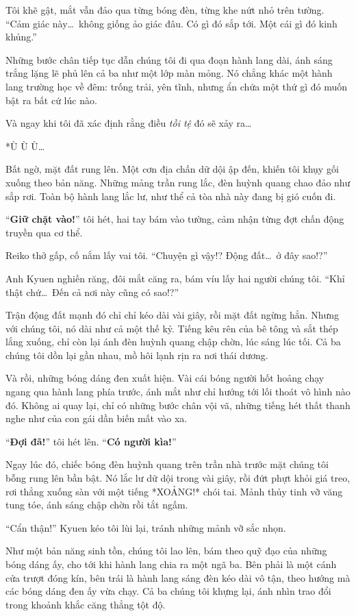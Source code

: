 \documentclass[../main.tex]{subfiles}
\begin{document}
Tôi khẽ gật, mắt vẫn đảo qua từng bóng đèn, từng khe nứt nhỏ trên tường. ``Cảm giác này\dots\ không giống ảo giác đâu. Có gì đó sắp tới. Một cái gì đó kinh khủng.''

Những bước chân tiếp tục dẫn chúng tôi đi qua đoạn hành lang dài, ánh sáng trắng lặng lẽ phủ lên cả ba như một lớp màn mỏng. Nó chẳng khác một hành lang trường học về đêm: trống trải, yên tĩnh, nhưng ẩn chứa một thứ gì đó muốn bật ra bất cứ lúc nào.

Và ngay khi tôi đã xác định rằng điều \emph{tồi tệ} đó sẽ xảy ra\dots

*Ù Ù Ù\dots*

Bất ngờ, mặt đất rung lên. Một cơn địa chấn dữ dội ập đến, khiến tôi khụy gối xuống theo bản năng. Những mảng trần rung lắc, đèn huỳnh quang chao đảo như sắp rơi. Toàn bộ hành lang lắc lư, như thể cả tòa nhà này đang bị gió cuốn đi.

``\textbf{Giữ chặt vào!}'' tôi hét, hai tay bám vào tường, cảm nhận từng đợt chấn động truyền qua cơ thể.

Reiko thở gấp, cố nắm lấy vai tôi. ``Chuyện gì vậy!? Động đất\dots\ ở đây sao!?''

Anh Kyuen nghiến răng, đôi mắt căng ra, bám víu lấy hai người chúng tôi. ``Khỉ thật chứ\dots\ Đến cả nơi này cũng có sao!?''

Trận động đất mạnh đó chỉ chỉ kéo dài vài giây, rồi mặt đất ngừng hẳn. Nhưng với chúng tôi, nó dài như cả một thế kỷ. Tiếng kêu rên của bê tông và sắt thép lắng xuống, chỉ còn lại ánh đèn huỳnh quang chập chờn, lúc sáng lúc tối. Cả ba chúng tôi dồn lại gần nhau, mồ hôi lạnh rịn ra nơi thái dương.

Và rồi, những bóng dáng đen xuất hiện. Vài cái bóng người hốt hoảng chạy ngang qua hành lang phía trước, ánh mắt như chỉ hướng tới lối thoát vô hình nào đó. Không ai quay lại, chỉ có những bước chân vội vã, những tiếng hét thất thanh nghe như của con gái dần biến mất vào xa.

``\textbf{Đợi đã!}'' tôi hét lên. ``\textbf{Có người kìa!}''

Ngay lúc đó, chiếc bóng đèn huỳnh quang trên trần nhà trước mặt chúng tôi bỗng rung lên bần bật. Nó lắc lư dữ dội trong vài giây, rồi đứt phựt khỏi giá treo, rơi thẳng xuống sàn với một tiếng *XOẢNG!* chói tai. Mảnh thủy tinh vỡ văng tung tóe, ánh sáng chập chờn rồi tắt ngấm.

``Cẩn thận!'' Kyuen kéo tôi lùi lại, tránh những mảnh vỡ sắc nhọn.

Như một bản năng sinh tồn, chúng tôi lao lên, bám theo quỹ đạo của những bóng dáng ấy, cho tới khi hành lang chia ra một ngã ba. Bên phải là một cánh cửa trượt đóng kín, bên trái là hành lang sáng đèn kéo dài vô tận, theo hướng mà các bóng dáng đen ấy vừa chạy. Cả ba chúng tôi khựng lại, ánh nhìn trao đổi trong khoảnh khắc căng thẳng tột độ.
\end{document}
